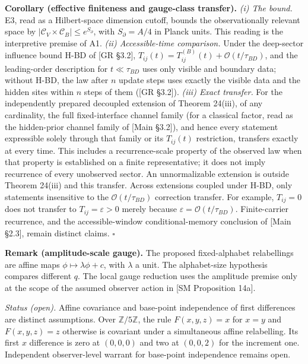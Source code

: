 \documentclass[
]{article}
\begin{document}
\textbf{Corollary (effective finiteness and gauge-class transfer).}
\emph{(i) The bound.} E3, read as a Hilbert-space dimension cutoff,
bounds the observationally relevant space by
\(|\mathcal C_V\times\mathcal C_B|\le e^{S_\partial}\), with
\(S_\partial=A/4\) in Planck units. This reading is the interpretive
premise of A1. \emph{(ii) Accessible-time comparison.} Under the
deep-sector influence bound H-BD of {[}GR §3.2{]},
\(T_{ij}(t)=T_{ij}^{(B)}(t)+\mathcal O(t/\tau_{BD})\), and the
leading-order description for \(t\ll\tau_{BD}\) uses only visible and
boundary data; without H-BD, the law after \(n\) update steps uses
exactly the visible data and the hidden sites within \(n\) steps of them
({[}GR §3.2{]}). \emph{(iii) Exact transfer.} For the independently
prepared decoupled extension of Theorem 24(iii), of any cardinality, the
full fixed-interface channel family (for a classical factor, read as the
hidden-prior channel family of {[}Main §3.2{]}), and hence every
statement expressible solely through that family or its \(T_{ij}(t)\)
restriction, transfers exactly at every time. This includes a
recurrence-scale property of the observed law when that property is
established on a finite representative; it does not imply recurrence of
every unobserved sector. An unnormalizable extension is outside Theorem
24(iii) and this transfer. Across extensions coupled under H-BD, only
statements insensitive to the \(\mathcal O(t/\tau_{BD})\) correction
transfer. For example, \(T_{ij}=0\) does not transfer to
\(T_{ij}=\varepsilon>0\) merely because
\(\varepsilon=\mathcal O(t/\tau_{BD})\). Finite-carrier recurrence, and
the accessible-window conditional-memory conclusion of {[}Main §2.3{]},
remain distinct claims. \(\square\)

\textbf{Remark (amplitude-scale gauge).} The proposed fixed-alphabet
relabellings are affine maps \(\phi\mapsto\lambda\phi+c\), with
\(\lambda\) a unit. The alphabet-size hypothesis compares different
\(q\). The local gauge reduction uses the amplitude premise only at the
scope of the assumed observer action in {[}SM Proposition 14a{]}.

\emph{Status (open).} Affine covariance and base-point independence of
first differences are distinct assumptions. Over
\(\mathbb Z/5\mathbb Z\), the rule \(F(x,y,z)=x\) for \(x=y\) and
\(F(x,y,z)=z\) otherwise is covariant under a simultaneous affine
relabelling. Its first \(x\) difference is zero at \((0,0,0)\) and two
at \((0,0,2)\) for the increment one. Independent observer-level warrant
for base-point independence remains open.
\end{document}
